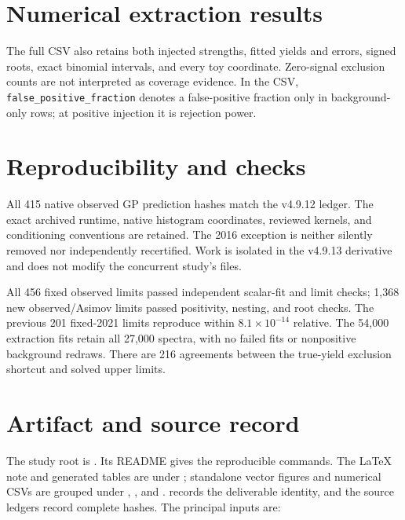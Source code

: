 \documentclass[11pt]{article}
\begin{document}
\clearpage
\appendix
\section{Numerical extraction results}



The full CSV also retains both injected strengths, fitted yields and errors,
signed roots, exact binomial intervals, and every toy coordinate. Zero-signal
exclusion counts are not interpreted as coverage evidence. In the CSV,
\texttt{false\_positive\_fraction} denotes a false-positive fraction only in
background-only rows; at positive injection it is rejection power.

\section{Reproducibility and checks}

All 415 native observed GP prediction hashes match the v4.9.12 ledger.
The exact archived runtime, native histogram coordinates, reviewed kernels,
and conditioning conventions are retained. The 2016 exception is neither
silently removed nor independently recertified. Work is isolated in the
v4.9.13 derivative and does not modify the concurrent study's files.

All 456 fixed observed limits passed independent scalar-fit and limit checks;
1,368 new observed/Asimov limits passed positivity, nesting, and root checks.
The previous 201 fixed-2021 limits reproduce within $8.1\times10^{-14}$
relative. The 54,000 extraction fits retain all 27,000 spectra, with no
failed fits or nonpositive background redraws. There are 216 agreements
between the true-yield exclusion shortcut and solved upper limits.

\clearpage
\section{Artifact and source record}

The study root is
.
Its README gives the reproducible commands. The LaTeX note and generated
tables are under ; standalone vector figures and numerical CSVs
are grouped under , , and .
 records the deliverable identity, and the source ledgers
record complete hashes. The principal inputs are:
\end{document}
